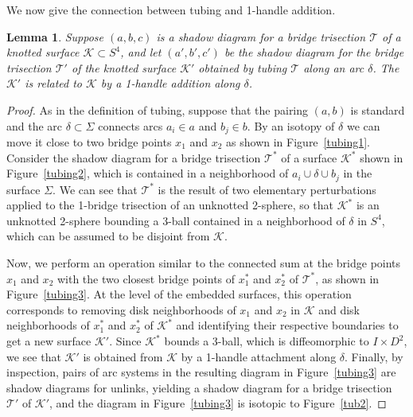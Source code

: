 \documentclass[11pt, oneside]{amsart}
\theoremstyle{theorem}
\newtheorem{lemma}[theorem]{Lemma}
\theoremstyle{definition}
\newcommand{\X}{\times}
\newcommand{\K}{\mathcal{K}}
\newcommand{\T}{\mathcal{T}}
\theoremstyle{theorem}
\begin{document}
We now give the connection between tubing and 1-handle addition.

\begin{lemma}\label{tuber}
Suppose $(a,b,c)$ is a shadow diagram for a bridge trisection $\T$ of a knotted surface $\K \subset S^4$, and let $(a',b',c')$ be the shadow diagram for the bridge trisection $\T'$ of the knotted surface $\K'$ obtained by tubing $\T$ along an arc $\delta$.  The $\K'$ is related to $\K$ by a 1-handle addition along $\delta$.
\end{lemma}

\begin{proof}
As in the definition of tubing, suppose that the pairing $(a,b)$ is standard and the arc $\delta \subset \Sigma$ connects arcs $a_i \in a$ and $b_j \in b$.  By an isotopy of $\delta$ we can move it close to two bridge points $x_1$ and $x_2$ as shown in Figure~\ref{tubing1}.  Consider the shadow diagram for a bridge trisection $\T^*$ of a surface $\K^*$ shown in Figure~\ref{tubing2}, which is contained in a neighborhood of $a_i\cup\delta\cup b_j$ in the surface $\Sigma$.  We can see that $\T^*$ is the result of two elementary perturbations applied to the 1-bridge trisection of an unknotted 2-sphere, so that $\K^*$ is an unknotted 2-sphere bounding a 3-ball contained in a neighborhood of $\delta$ in $S^4$, which can be assumed to be disjoint from $\K$.

Now, we perform an operation similar to the connected sum at the bridge points $x_1$ and $x_2$ with the two closest bridge points of $x_1^*$ and $x_2^*$ of $\T^*$, as shown in Figure~\ref{tubing3}.  At the level of the embedded surfaces, this operation corresponds to removing disk neighborhoods of $x_1$ and $x_2$ in $\K$ and disk neighborhoods of $x_1^*$ and $x_2^*$ of $\K^*$ and identifying their respective boundaries to get a new surface $\K'$.  Since $\K^*$ bounds a 3-ball, which is diffeomorphic to $I \X D^2$, we see that $\K'$ is obtained from $\K$ by a 1-handle attachment along $\delta$.  Finally, by inspection, pairs of arc systems in the resulting diagram in Figure~\ref{tubing3} are shadow diagrams for unlinks, yielding a shadow diagram for a bridge trisection $\T'$ of $\K'$, and the diagram in Figure~\ref{tubing3} is isotopic to Figure~\ref{tub2}.
\end{proof}  
\end{document}
